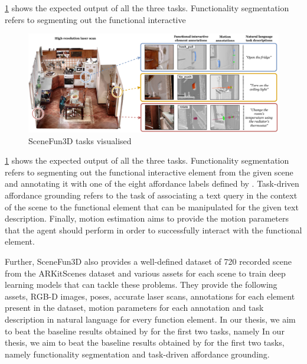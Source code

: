 \cref{fig:your_image_label} shows the expected output of all the three tasks. Functionality segmentation refers to segmenting out the functional interactive 
\begin{figure}[ht!]
    \centering
    \includegraphics[width=\textwidth]{content/images/SceneFun3D.png}
    \caption{SceneFun3D tasks visualised \cite{delitzas2024scenefun3d}}
    \label{fig:your_image_label}
\end{figure}
\cref{fig:your_image_label} shows the expected output of all the three tasks. Functionality segmentation refers to segmenting out the functional interactive 
element from the given scene and annotating it with one of the eight affordance labels defined by \cite{gibson}. Task-driven affordance grounding refers to the task
of associating a text query in the context of the scene to the functional element that can be manipulated for the given text description. Finally, motion estimation
aims to provide the motion parameters that the agent should perform in order to successfully interact with the functional element.

Further, SceneFun3D also provides a well-defined dataset of 720 recorded scene from the ARKitScenes dataset and various assets for each scene 
to train deep learning models that can tackle these problems. They provide the following assets, RGB-D images, poses, accurate laser scans, 
annotations for each element present in the dataset, motion parameters for each annotation and task description in natural language for every function element.
In our thesis, we aim to beat the baseline results obtained by \citet{delitzas2024scenefun3d} for the first two tasks, namely 
In our thesis, we aim to beat the baseline results obtained by \citet{delitzas2024scenefun3d} for the first two tasks, namely 
functionality segmentation and task-driven affordance grounding. 

